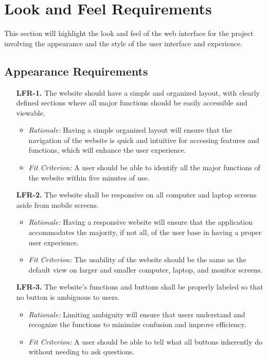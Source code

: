 \documentclass[12pt]{article}
\begin{document}
\section{Look and Feel Requirements}
This section will highlight the look and feel of the web interface for the
project involving the appearance and the style of the user interface and
experience.
\subsection{Appearance Requirements}
\begin{enumerate}
  \item[\textbf{LFR-1.}] The website should have a simple and organized layout, with
  clearly defined sections where all major functions should be easily accessible
  and viewable.
  \begin{itemize}
    \item \textit{Rationale:} Having a simple organized layout will ensure that the
    navigation of the website is quick and intuitive for accessing features and
    functions, which will enhance the user experience.
    \item \textit{Fit Criterion:} A user should be able to identify all the major
    functions of the website within five minutes of use.
  \end{itemize}
  
  \item[\textbf{LFR-2.}] The website shall be responsive on all computer and laptop screens
  aside from mobile screens.
  \begin{itemize}
    \item \textit{Rationale:} Having a responsive website will ensure that the
    application accommodates the majority, if not all, of the user base in having a
    proper user experience. 
    \item \textit{Fit Criterion:} The usability of the website should be the same
    as the default view on larger and smaller computer, laptop, and monitor screens.
  \end{itemize}
  
  \item[\textbf{LFR-3.}] The website's functions and buttons shall be properly labeled
  so that no button is ambiguous to users.
  \begin{itemize}
    \item \textit{Rationale:} Limiting ambiguity will ensure that users
    understand and recognize the functions to minimize confusion and improve
    efficiency.
    \item \textit{Fit Criterion:} A user should be able to tell what all buttons
    inherently do without needing to ask questions.
  \end{itemize}
  

\end{enumerate}
\end{document}
